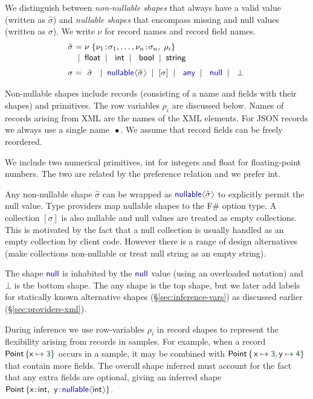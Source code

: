 \documentclass[10pt]{sigplanconf}
\newcommand{\langl}{\begin{picture}(4.5,7)
\put(1.1,2.5){\rotatebox{60}{\line(1,0){5.5}}}
\put(1.1,2.5){\rotatebox{300}{\line(1,0){5.5}}}
\end{picture}}
\newcommand{\rangl}{\begin{picture}(4.5,7)
\put(.9,2.5){\rotatebox{120}{\line(1,0){5.5}}}
\put(.9,2.5){\rotatebox{240}{\line(1,0){5.5}}}
\end{picture}}
\newcommand{\kvd}[1]{\textnormal{\textcolor{kvdclr}{\sffamily #1}}}
\newcommand{\num}[1]{\textnormal{\textcolor{numclr}{\sffamily #1}}}
\newcommand{\ident}[1]{\textnormal{\sffamily #1}}
\newcommand{\lsep}[0]{\;\; | \;\;}
\newcommand{\narrow}[1]{\hspace{-0.7em} #1 \hspace{-0.7em}}
\begin{document}
We distinguish between \emph{non-nullable shapes} that always have a valid value (written as 
$\hat{\sigma}$) and \emph{nullable shapes} that encompass missing and \kvd{null} values 
(written as $\sigma$). We write $\nu$ for record names and record field names. 
%
\begin{equation*}
\begin{array}{rcl}
 \hat{\sigma} &\narrow{=}& \nu \; \{ \nu_1 \!:\! \sigma_1, \ldots, \nu_n \!:\! \sigma_n,\; \rho_i  \} \\[0.1em]
                &\narrow{|}& \ident{float} \lsep \ident{int} \lsep \ident{bool} \lsep \ident{string} 
 \\[0.6em] 
       \sigma &\narrow{=}& ~\hat{\sigma}~ \lsep \kvd{nullable}\langl \hat{\sigma} \rangl \lsep [\sigma] \lsep \kvd{any} \lsep \kvd{null}  \lsep ~\bot~
\end{array}
\end{equation*}

\noindent
Non-nullable shapes include records (consisting of a name and fields with their shapes) and 
primitives. The row variables $\rho_i$ are discussed below. Names of records arising from XML are the names of the XML elements.
For JSON records we always use a single name $\,\bullet$. We assume that record fields can be freely
reordered.

We include two numerical primitives, \ident{int} for integers and \ident{float} for floating-point 
numbers. The two are related by the preference relation and we prefer \ident{int}.

Any non-nullable shape $\hat{\sigma}$ can be wrapped as $\kvd{nullable}\langl\hat{\sigma}\rangl$ to 
explicitly permit the \kvd{null} value. Type providers map \kvd{nullable} shapes to the F\# option
type. A collection $[\sigma]$ is also nullable and \kvd{null} values are treated as empty 
collections. This is motivated by the fact that a \kvd{null} collection is usually
handled as an empty collection by client code. However there is a range of design alternatives (make collections
non-nullable or treat \kvd{null} \ident{string} as an empty string).

The shape $\kvd{null}$ is inhabited by the $\kvd{null}$ value (using an overloaded 
notation) and $\bot$ is the bottom shape. The \kvd{any} shape is the top shape, but we later add
labels for statically known alternative shapes (\S\ref{sec:inference-vars}) as 
discussed earlier (\S\ref{sec:providers-xml}).

During inference we use row-variables $\rho_i$ \cite{rows-cardelli} in record shapes to represent 
the flexibility arising from records in samples. For example, when a 
record $\ident{Point}\,\{ \ident{x} \mapsto \num{3} \}$ occurs in a sample,
it may be combined with $\ident{Point}\,\{\, \ident{x}\mapsto\num{3}, \ident{y}\mapsto\num{4} \}$ that contain more fields. The
overall shape inferred must account for the fact that any extra fields are optional,
giving an inferred shape $\ident{Point}\,\{ \ident{x}\!:\!\ident{int},~ \ident{y}\!:\!\kvd{nullable}\langl\ident{int}\rangl\}$.
\end{document}
